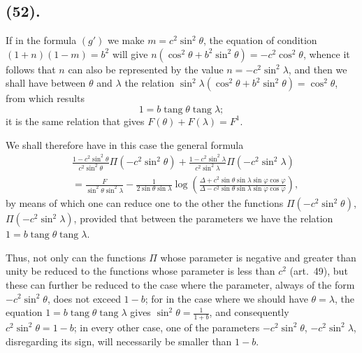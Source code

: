 \documentclass{article}
\begin{document}
\subsection*{(52).}

If in the formula $(g')$ we make $m=c^{2}\sin^{2}\theta$, the equation of condition $(1+n)(1-m)=b^{2}$ will give $n(\cos^{2}\theta+b^{2}\sin^{2}\theta)=-c^{2}\cos^{2}\theta$, whence it follows that $n$ can also be represented by the value $n=-c^{2}\sin^{2}\lambda$, and then we shall have between $\theta$ and $\lambda$ the relation $\sin^{2}\lambda(\cos^{2}\theta+b^{2}\sin^{2}\theta)=\cos^{2}\theta$, from which results
\[ 1=b\operatorname{tang}\theta\operatorname{tang}\lambda; \]
it is the same relation that gives $F(\theta)+F(\lambda)=F^{1}$.

We shall therefore have in this case the general formula
\[ \begin{aligned} &\frac{1-c^{2}\sin^{2}\theta}{c^{2}\sin^{2}\theta}\Pi(-c^{2}\sin^{2}\theta)+\frac{1-c^{2}\sin^{2}\lambda}{c^{2}\sin^{2}\lambda}\Pi(-c^{2}\sin^{2}\lambda)\\ &=\frac{F}{\sin^{2}\theta\sin^{2}\lambda}-\frac{1}{2\sin\theta\sin\lambda}\log\left(\frac{\Delta+c^{2}\sin\theta\sin\lambda\sin\varphi\cos\varphi}{\Delta-c^{2}\sin\theta\sin\lambda\sin\varphi\cos\varphi}\right), \end{aligned} \]
by means of which one can reduce one to the other the functions $\Pi(-c^{2}\sin^{2}\theta)$, $\Pi(-c^{2}\sin^{2}\lambda)$, provided that between the parameters we have the relation $1=b\operatorname{tang}\theta\operatorname{tang}\lambda$.

Thus, not only can the functions $\Pi$ whose parameter is negative and greater than unity be reduced to the functions whose parameter is less than $c^{2}$ (art.\ 49), but these can further be reduced to the case where the parameter, always of the form $-c^{2}\sin^{2}\theta$, does not exceed $1-b$; for in the case where we should have $\theta=\lambda$, the equation $1=b\operatorname{tang}\theta\operatorname{tang}\lambda$ gives $\sin^{2}\theta=\frac{1}{1+b}$, and consequently $c^{2}\sin^{2}\theta=1-b$; in every other case, one of the parameters $-c^{2}\sin^{2}\theta$, $-c^{2}\sin^{2}\lambda$, disregarding its sign, will necessarily be smaller than $1-b$.
\end{document}
